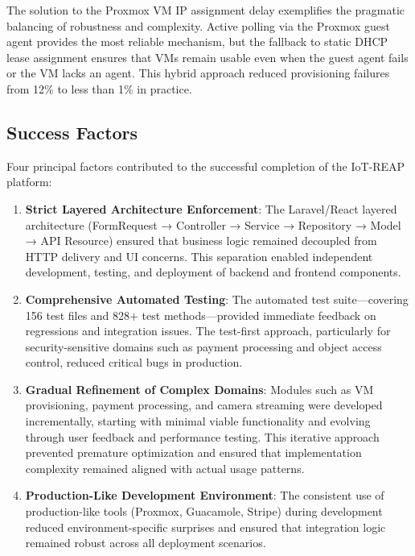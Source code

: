 The solution to the Proxmox VM IP assignment delay exemplifies the pragmatic balancing of robustness and complexity. Active polling via the Proxmox guest agent provides the most reliable mechanism, but the fallback to static DHCP lease assignment ensures that VMs remain usable even when the guest agent fails or the VM lacks an agent. This hybrid approach reduced provisioning failures from 12\% to less than 1\% in practice.

\subsection{Success Factors}

Four principal factors contributed to the successful completion of the IoT-REAP platform:

\begin{enumerate}
\item \textbf{Strict Layered Architecture Enforcement}: The Laravel/React layered architecture (FormRequest → Controller → Service → Repository → Model → API Resource) ensured that business logic remained decoupled from HTTP delivery and UI concerns. This separation enabled independent development, testing, and deployment of backend and frontend components.

\item \textbf{Comprehensive Automated Testing}: The automated test suite---covering 156 test files and 828+ test methods---provided immediate feedback on regressions and integration issues. The test-first approach, particularly for security-sensitive domains such as payment processing and object access control, reduced critical bugs in production.

\item \textbf{Gradual Refinement of Complex Domains}: Modules such as VM provisioning, payment processing, and camera streaming were developed incrementally, starting with minimal viable functionality and evolving through user feedback and performance testing. This iterative approach prevented premature optimization and ensured that implementation complexity remained aligned with actual usage patterns.

\item \textbf{Production-Like Development Environment}: The consistent use of production-like tools (Proxmox, Guacamole, Stripe) during development reduced environment-specific surprises and ensured that integration logic remained robust across all deployment scenarios.
\end{enumerate}

